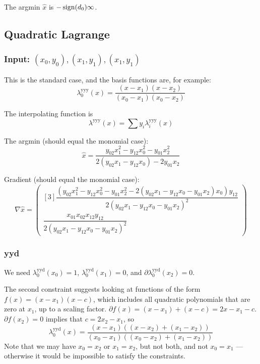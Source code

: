 The argmin $\hat{x}$ is $-\operatorname*{sign}(d_0)\infty$.

\subsection{Quadratic Lagrange}

\subsubsection{Input: $(x_0,y_0),(x_1,y_1),(x_1,y_1)$}

This is the standard case, and the basis functions are,
for example:
\begin{equation}
\lambda^{\text{yyy}}_0(x) = 
\frac {(x - x_1) (x - x_2)} {(x_0 - x_1) (x_0 - x_2)}
\end{equation}

The interpolating function is 
\begin{equation}
\lambda^{\text{yyy}}(x) = 
\sum y_i \lambda^{\text{yyy}}_i(x)
\end{equation}

The argmin (should equal the monomial case):
\begin{equation}
\hat{x} = 
\dfrac{y_{02} x_1^{2}-y_{12} x_0^{2}-y_{01} x_2^{2}
}{
2 \left(y_{02} x_1-y_{12} x_0\right)-2 y_{01} x_2
}
\end{equation}

Gradient (should equal the monomial case):
\begin{equation}
\nabla \hat{x} =
\begin{pmatrix}[3]
\dfrac{
\left(y_{02} x_1^{2}-y_{12} x_0^{2}-y_{01} x_2^{2}
-2 \left(y_{02} x_1-y_{12} x_0-y_{01} x_2\right) x_0\right) y_{12}
}{
2 \left(y_{02} x_1-y_{12} x_0-y_{01} x_2 \right)^{2}
}
\\
\dfrac{
x_{01} x_{02} x_{12} y_{12}
}{
2 \left(y_{02} x_1-y_{12} x_0-y_{01} x_2\right)^{2}
}
\end{pmatrix}
\end{equation}

\subsubsection{yyd}

We need 
$\lambda^{\text{yyd}}_0(x_0) = 1$, 
$\lambda^{\text{yyd}}_0(x_1) = 0$, and
$\partial\lambda^{\text{yyd}}_0(x_2) = 0$. 

The second constraint suggests looking at functions of the form
$f(x) = (x - x_1) (x - c)$, which includes all quadratic 
polynomials that are zero at $x_1$, up to a scaling factor.  
$\partial{f}(x) = (x - x_1) + (x - c) = 2 x - x_1 - c$.
$\partial{f}(x_2) = 0$ implies that
$c = 2 x_2 - x_1$,
so
\begin{equation}
\lambda^{\text{yyd}}_0(x) = 
\frac 
{(x - x_1) \left( (x - x_2) + (x_1 - x_2) \right)} 
{(x_0 - x_1) ((x_0 - x_2) + (x_1 - x_2))}
\end{equation}
Note that we may have $x_0 = x_2$ or $x_1 = x_2$, but not both,
and not $x_0 = x_1$ --- otherwise it would be impossible to 
satisfy the constraints.

